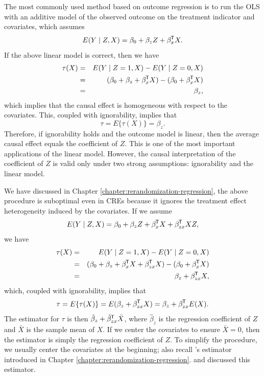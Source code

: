 The most commonly used method based on outcome regression is to run the OLS with an additive model of the observed outcome on the treatment indicator and covariates, which assumes
$$
E(Y\mid Z, X) = \beta_0 + \beta_z Z  + \beta_x ^{\mkern-1.5mu\mathsf{T}} X .
$$
If the above linear model is correct, then we have
\begin{eqnarray*}
\tau(X) &=&  E(Y\mid Z=1, X) - E(Y\mid Z=0, X) \\
&=& (\beta_0 + \beta_z   + \beta_x^{\mkern-1.5mu\mathsf{T}}  X ) - ( \beta_0    + \beta_x^{\mkern-1.5mu\mathsf{T}}  X )  \\
&=& \beta_z,
\end{eqnarray*}
which implies that the causal effect is homogeneous with respect to the covariates. This, coupled with ignorability, implies that
$$
\tau = E\{ \tau(X)  \} = \beta_z.
$$
Therefore, if ignorability holds and the outcome model is linear, then the average causal effect equals the coefficient of $Z$. This is one of the most important applications of the linear model. However, the causal interpretation of the coefficient of $Z$ is valid only under two strong assumptions: ignorability and the linear model. 
 
 
 
We have discussed in Chapter \ref{chapter:rerandomization-regression}, the above procedure is suboptimal even in CREs because it ignores the treatment effect heterogeneity induced by the covariates. 
If we assume
$$
E(Y\mid Z, X) = \beta_0 + \beta_z Z  + \beta_x^{\mkern-1.5mu\mathsf{T}}  X  + \beta_{zx}^{\mkern-1.5mu\mathsf{T}}  X Z,
$$
we have
\begin{eqnarray*}
\tau(X) &=& 
E(Y\mid Z=1, X) - E(Y\mid Z=0, X)  \\
&=& (\beta_0 + \beta_z   + \beta_x^{\mkern-1.5mu\mathsf{T}}  X +\beta_{zx}^{\mkern-1.5mu\mathsf{T}}  X ) - ( \beta_0    + \beta_x^{\mkern-1.5mu\mathsf{T}}  X ) \\
&=& \beta_z+  \beta_{zx}^{\mkern-1.5mu\mathsf{T}}  X,
\end{eqnarray*}
which, coupled with ignorability, implies that
$$
\tau = E\{ \tau(X)  \} =E(\beta_z+  \beta_{zx}^{\mkern-1.5mu\mathsf{T}}  X) = \beta_z + \beta_{zx}^{\mkern-1.5mu\mathsf{T}} E(X). 
$$
The estimator for $\tau$ is then $ \hat{\beta}_z + \hat{\beta}_{zx}^{\mkern-1.5mu\mathsf{T}}  \bar{X}$, where $\hat{\beta}_z$ is the regression coefficient of $Z$ and $\bar{X}$ is the sample mean of $X$. If we center the covariates to ensure $\bar{X}=0$, then the estimator is simply the regression coefficient of $Z$. To simplify the procedure, we usually center the covariates at the beginning; also recall \citet{lin2013}'s estimator introduced in Chapter \ref{chapter:rerandomization-regression}.  \citet{rosenbaum1983central} and \citet{hirano2001estimation} discussed this estimator. 



